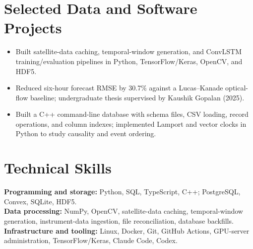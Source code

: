 \section{Selected Data and Software Projects}
\begin{itemize}
  \item Built satellite-data caching, temporal-window generation, and ConvLSTM training/evaluation pipelines in Python, TensorFlow/Keras, OpenCV, and HDF5.
  \item Reduced six-hour forecast RMSE by 30.7\% against a Lucas--Kanade optical-flow baseline; undergraduate thesis supervised by Kaushik Gopalan (2025).
\end{itemize}
\begin{itemize}
  \item Built a C++ command-line database with schema files, CSV loading, record operations, and column indexes; implemented Lamport and vector clocks in Python to study causality and event ordering.
\end{itemize}
\section{Technical Skills}
\textbf{Programming and storage:} Python, SQL, TypeScript, C++; PostgreSQL, Convex, SQLite, HDF5.\\
\textbf{Data processing:} NumPy, OpenCV, satellite-data caching, temporal-window generation, instrument-data ingestion, file reconciliation, database backfills.\\
\textbf{Infrastructure and tooling:} Linux, Docker, Git, GitHub Actions, GPU-server administration, TensorFlow/Keras, Claude Code, Codex.

